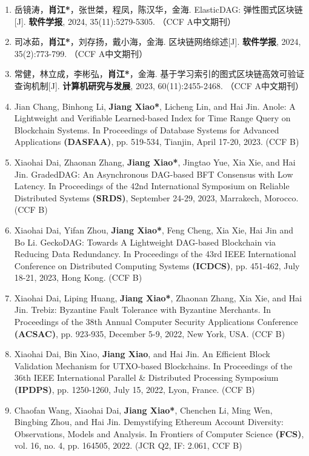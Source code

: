 \begin{enumerate}[itemsep=0pt, topsep=0pt, parsep=0pt]
    \item 岳镜涛，\textbf{肖江*}，张世桀，程凤，陈汉华，金海. ElasticDAG: 弹性图式区块链[J]. \textbf{软件学报}, 2024, 35(11):5279-5305. （CCF A中文期刊）

    \item 司冰茹，\textbf{肖江*}，刘存扬，戴小海，金海. 区块链网络综述[J]. \textbf{软件学报}, 2024, 35(2):773-799. （CCF A中文期刊）
    \item 常健，林立成，李彬弘，\textbf{肖江*}，金海. 基于学习索引的图式区块链高效可验证查询机制[J]. \textbf{计算机研究与发展}, 2023, 60(11):2455-2468. （CCF A中文期刊）
    \item Jian Chang, Binhong Li, \textbf{Jiang Xiao*}, Licheng Lin, and Hai Jin. Anole: A Lightweight and Verifiable Learned-based Index for Time Range Query on Blockchain Systems. In Proceedings of Database Systems for Advanced Applications \textbf{(DASFAA)}, pp. 519-534, Tianjin, April 17-20, 2023. (CCF B)
    \item Xiaohai Dai, Zhaonan Zhang, \textbf{Jiang Xiao*}, Jingtao Yue, Xia Xie, and Hai Jin. GradedDAG: An Asynchronous DAG-based BFT Consensus with Low Latency. In Proceedings of the 42nd International Symposium on Reliable Distributed Systems \textbf{(SRDS)}, September 24-29, 2023, Marrakech, Morocco. (CCF B)
    \item Xiaohai Dai, Yifan Zhou, \textbf{Jiang Xiao*}, Feng Cheng, Xia Xie, Hai Jin and Bo Li. GeckoDAG: Towards A Lightweight DAG-based Blockchain via Reducing Data Redundancy. In Proceedings of the 43rd IEEE International Conference on Distributed Computing Systems \textbf{(ICDCS)}, pp. 451-462, July 18-21, 2023, Hong Kong. (CCF B)

    \item Xiaohai Dai, Liping Huang, \textbf{Jiang Xiao*}, Zhaonan Zhang, Xia Xie, and Hai Jin. Trebiz: Byzantine Fault Tolerance with Byzantine Merchants. In Proceedings of the 38th Annual Computer Security Applications Conference \textbf{(ACSAC)}, pp. 923-935, December 5-9, 2022, New York, USA. (CCF B)
    \item Xiaohai Dai, Bin Xiao, \textbf{Jiang Xiao}, and Hai Jin. An Efficient Block Validation Mechanism for UTXO-based Blockchains. In Proceedings of the 36th IEEE International Parallel \& Distributed Processing Symposium \textbf{(IPDPS)}, pp. 1250-1260, July 15, 2022, Lyon, France. (CCF B)

    \item Chaofan Wang, Xiaohai Dai, \textbf{Jiang Xiao*}, Chenchen Li, Ming Wen, Bingbing Zhou, and Hai Jin. Demystifying Ethereum Account Diversity: Observations, Models and Analysis. In Frontiers of Computer Science \textbf{(FCS)}, vol. 16, no. 4, pp. 164505, 2022. (JCR Q2, IF: 2.061, CCF B)


\end{enumerate}
